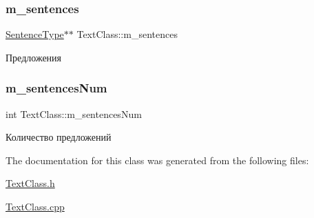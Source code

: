 \subsubsection{\texorpdfstring{m\+\_\+sentences}{m\_sentences}}
{\footnotesize\ttfamily \hyperlink{struct_text_class_1_1_sentence_type}{Sentence\+Type}$\ast$$\ast$ Text\+Class\+::m\+\_\+sentences\hspace{0.3cm}{\ttfamily [private]}}



Предложения 

\mbox{\label{class_text_class_a848c8fd97aa51f5d1f1a6c7beb1f0107}} 
\subsubsection{\texorpdfstring{m\+\_\+sentences\+Num}{m\_sentencesNum}}
{\footnotesize\ttfamily int Text\+Class\+::m\+\_\+sentences\+Num\hspace{0.3cm}{\ttfamily [private]}}



Количество предложений 



The documentation for this class was generated from the following files\+:\begin{DoxyCompactItemize}
\item 
\hyperlink{_text_class_8h}{Text\+Class.\+h}\item 
\hyperlink{_text_class_8cpp}{Text\+Class.\+cpp}\end{DoxyCompactItemize}

